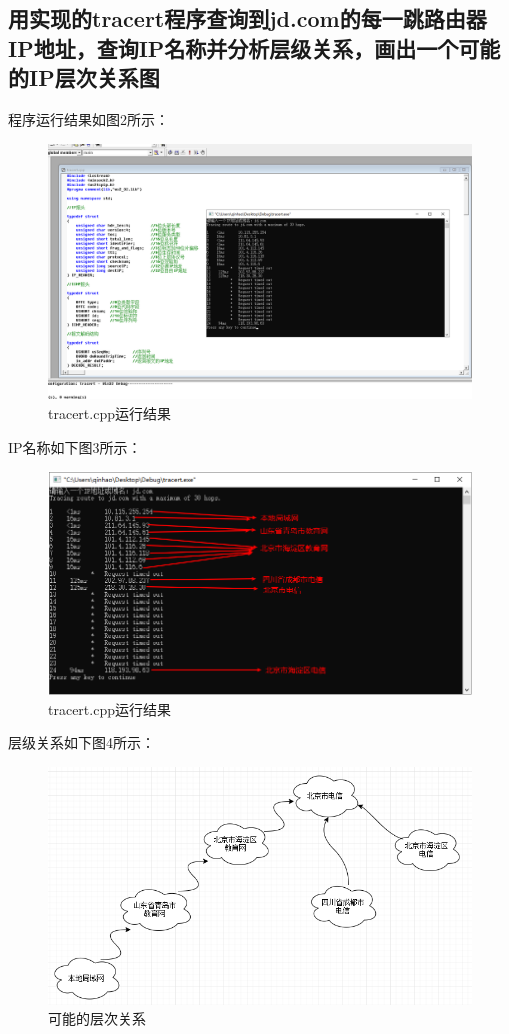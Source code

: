 \documentclass[a4paper,UTF8]{article}
\begin{document}
\subsection{用实现的tracert程序查询到jd.com的每一跳路由器IP地址，查询IP名称并分析层级关系，画出一个可能的IP层次关系图}
程序运行结果如图2所示：\\
\begin{figure}[htbp]
    \centering
    \includegraphics[width=1\textwidth]{tracert}
    \caption{tracert.cpp运行结果}
    \label{tracert}
\end{figure}
IP名称如下图3所示：\\
\begin{figure}[htbp]
    \centering
    \includegraphics[width=1\textwidth]{tracert_path}
    \caption{tracert.cpp运行结果}
    \label{tracert_path}
\end{figure}
层级关系如下图4所示：\\
\begin{figure}[htbp]
    \centering
    \includegraphics[width=1\textwidth]{tracert_level}
    \caption{可能的层次关系}
    \label{tracert_level}
\end{figure}
\end{document}
